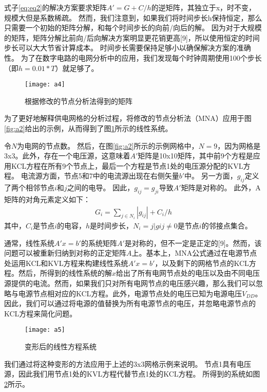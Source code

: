 式子\ref{eq:eq2}的解决方案要求矩阵$A'= G + C / h$的逆矩阵，其独立于x，时不变，规模大但是系数稀疏。 然而，我们注意到，如果我们将时间步长h保持恒定，那么只需要一个初始的矩阵分解，和每个时间步长的向前/向后的解。 因为对于大规模的矩阵，矩阵分解比前向/后向解决方案明显更花销更高[9]，所以使用恒定的时间步长可以大大节省计算成本。 时间步长需要保持足够小以确保解决方案的准确性。 为了在数字电路的电网分析中的应用，我们发现每个时钟周期使用100个步长（即$h = 0.01 * T$）就足够了。

\begin{figure}[H] %
  \centering
  \texttt{[image: a4]}
  \caption{根据修改的节点分析法得到的矩阵}
  \label{fig:a4}
\end{figure}

为了更好地解释供电网格的分析过程，将修改的节点分析法（MNA）应用于图\ref{fig:a2}给出的示例，从而得到了图\ref{fig:a4}所示的线性系统。

令$N$为电网的节点数。 然后，在图\ref{fig:a2}所示的示例网格中，$N = 9$，因为网格是3x3。此外，存在一个电压源，这意味着$A'$矩阵是10x10矩阵，其中前9个方程是应用KCL方程在所有9个节点上，最后一个方程是节点1处的电压源分配的KVL方程。 电流源方面，节点5和7中的电流源出现在右侧矢量$b'$中。 另一方面，$g_{ij}$定义了两个相邻节点$i$和$j$之间的电导。 因此，$g_{ij} = g_{ji}$导致$A'$矩阵是对称的。 此外，A矩阵的对角元素定义如下：
\begin{align}
    G_i = \sum_{j\in N_i} |g_{ij}| + C_i/h
    \label{eq:eq3}
\end{align}
其中，$C_i$是节点$i$的电容，$h$是时间步长，$N_i={j|g{ij}\neq 0}$是节点$i$的邻接点集合。

通常，线性系统$A'x = b'$的系统矩阵$A'$是对称的，但不一定是正定的[9]。然而，该问题可以被重新归纳到对称的正定矩阵$A$上。基本上，MNA公式通过在电源节点处运用KCL和KVL方程来构建线性系统$A'x = b'$，以及剩下的网格节点的KCL方程。然后，所得到的线性系统的解$x$给出了所有电网节点处的电压以及由不同电压源提供的电流。然而，如果我们只对所有电网节点的电压感兴趣，那么我们可以忽略与电源节点相对应的KCL方程。此外，电源节点处的电压已知为电源电压$V_{DD}$。因此，我们可以通过将电源的值替换为所有电源节点的电压，并忽略电源节点的KCL方程来简化问题。

\begin{figure}[H] %
  \centering
  \texttt{[image: a5]}
  \caption{变形后的线性方程系统}
  \label{fig:a5}
\end{figure}

我们通过将这种变形的方法应用于上述的3x3网格示例来说明。 节点1具有电压源，因此我们用节点1处的KVL方程代替节点1处的KCL方程。 所得到的系统如图\ref{fig:a5}所示。

